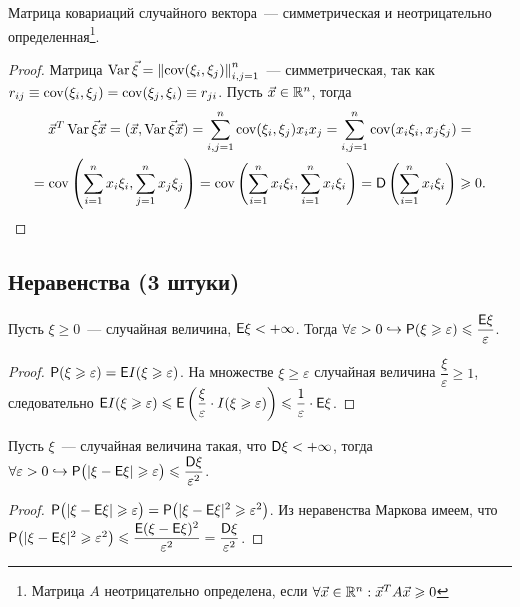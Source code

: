 \begin{lemma}
	Матрица ковариаций случайного вектора~--- симметрическая и неотрицательно определенная\footnote{Матрица $A$ неотрицательно определена, если $\forall \vec x \in \mathbb{R}^n: {\vec x}^T A \vec x \geqslant 0$}.
	\begin{proof}
		Матрица $\operatorname{Var} \vec \xi = \left\| \operatorname{cov} (\xi_i, \xi_j ) \right\|_{i, j = 1}^n$~--- симметрическая, так как $r_{ij} \equiv \operatorname{cov} ( \xi_i, \xi_j ) = \operatorname{cov} (\xi_j, \xi_i) \equiv r_{ji}$. Пусть $\vec x \in \mathbb{R}^n$, тогда 
		\begin{multline*}
			{\vec x}^T \operatorname{Var} \vec \xi \vec x = ( \vec x, \operatorname{Var} \vec \xi \vec x ) = \sum_{i,j=1}^n \operatorname{cov} (\xi_i, \xi_j ) x_i x_j = \sum_{i,j=1}^n \operatorname{cov} (x_i \xi_i, x_j \xi_j) =\\ = \operatorname{cov} \left( \sum_{i=1}^n  x_i \xi_i, \sum_{j=1}^n x_j \xi_j \right) = \operatorname{cov} \left( \sum_{i=1}^n  x_i \xi_i, \sum_{i=1}^n x_i \xi_i \right) =\mathsf{D} \left( \sum_{i=1}^n x_i \xi_i \right) \geqslant 0.
		\end{multline*}
	\end{proof}
\end{lemma}

\subsection{Неравенства (3 штуки)}
\begin{lemma}
	Пусть $\xi \geqslant 0$~--- случайная величина, $\mathsf{E} \xi < +\infty$. Тогда $\forall \varepsilon > 0 \hookrightarrow \mathsf{P} (\xi \geqslant \varepsilon ) \leqslant \dfrac{\mathsf{E} \xi}{\varepsilon}$.
	\begin{proof}
		$\mathsf{P} (\xi \geqslant \varepsilon ) = \mathsf{E} I(\xi \geqslant \varepsilon)$. На множестве ${ \xi \geqslant \varepsilon}$ случайная величина $\dfrac{\xi}{\varepsilon} \geqslant 1$, следовательно $\mathsf{E} I(\xi \geqslant \varepsilon) \leqslant \mathsf{E} \left( \dfrac{\xi}{\varepsilon} \cdot I (\xi \geqslant \varepsilon) \right) \leqslant \dfrac{1}{\varepsilon} \cdot  \mathsf{E} \xi$.
	\end{proof}
\end{lemma}

\begin{lemma}
	Пусть $\xi$~--- случайная величина такая, что $\mathsf{D} \xi < + \infty$, тогда $\forall \varepsilon > 0 \hookrightarrow \mathsf{P} \big(|\xi - \mathsf{E} \xi | \geqslant \varepsilon \big) \leqslant \dfrac{\mathsf{D} \xi}{\varepsilon^2}$.
	\begin{proof}
		$\mathsf{P} \big(|\xi - \mathsf{E} \xi | \geqslant \varepsilon\big) = \mathsf{P} \big( | \xi - \mathsf{E} \xi |^2 \geqslant \varepsilon^2 \big)$. Из неравенства Маркова имеем, что $\mathsf{P} \big( | \xi - \mathsf{E} \xi |^2 \geqslant \varepsilon^2 \big) \leqslant \dfrac{\mathsf{E} (\xi - \mathsf{E} \xi )^2}{\varepsilon^2} = \dfrac{\mathsf{D} \xi}{\varepsilon^2}$.
	\end{proof} 
\end{lemma}

